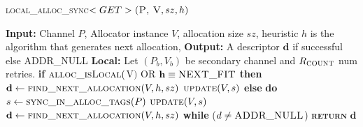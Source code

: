 \documentclass[10pt]{article}
\begin{document}
\begin{algorithm}{}
\footnotesize
\caption{\textsc{local\_alloc\_sync}{$<GET>\textsc{(P, V}, sz, h)$}}
\label{alg:lalloc_get} 
\begin{algorithmic}[1]


\STATE \textbf{Input:} Channel $P$, Allocator instance $V$, allocation size $sz$, heuristic $h$
is the algorithm that generates next allocation, 
\STATE \textbf{Output:} A descriptor {$\textbf{d}$} if successful else \textsc{ADDR\_NULL}
\STATE \textbf{Local:} Let $(P_{b}, V_{b})$ be secondary channel and $R_{\textsc{COUNT}}$ num retries.
\STATE \textbf{if} $\textsc{alloc\_isLocal}($V$)$ OR $\textbf{h} \equiv \textsc{NEXT\_FIT}$  \textbf{then} 
\STATE \quad $\textbf{d} \leftarrow  \textsc{find\_next\_allocation}(V, h, sz)$ 
\STATE \quad $\textsc{update}(V, s)$
\STATE \textbf{else}
\STATE \quad \textbf{do}
\STATE \qquad $s \gets \textsc{sync\_in\_alloc\_tags}(P)$
\STATE \qquad $\textsc{update}(V, s)$
\STATE \qquad $\textbf{d} \leftarrow  \textsc{find\_next\_allocation}(V, h, sz)$
\STATE \quad \textbf{while} ($d \neq \textsc{ADDR\_NULL}$)
\STATE \textsc{\textbf{return}} {$\textbf{d}$}
\STATE


\end{algorithmic}
\end{algorithm}
\end{document}

